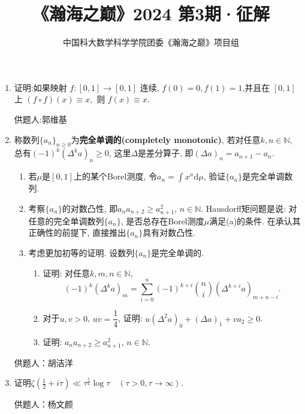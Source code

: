 \documentclass[lang=cn,12pt,a4paper]{elegantpaper.cls}
\title{《瀚海之巅》2024 第3期·征解}
\author{中国科大数学科学学院团委\quad《瀚海之巅》项目组}
\date{\zhtoday}
\begin{document}
\maketitle
\begin{enumerate}
	\item 
	证明:如果映射 $f:[0,1]\rightarrow[0,1]$ 连续, $f(0)=0,f(1)=1$,并且在 $[0,1]$ 上 $(f\circ f)(x)\equiv x,$ 则 $f(x)\equiv x.$
	
	\begin{flushright}
		\kaishu
		供题人:郭维基
	\end{flushright}
	
	
	\item 称数列$\{a_n\}_{n\geq 0}$为\textbf{完全单调的(completely monotonic)}, 若对任意$k,n\in\mathbb N$, 总有$(-1)^k(\Delta^k a)_n\geq 0$, 这里$\Delta$是差分算子, 即$(\Delta a)_n=a_{n+1}-a_n$.
	
	\begin{enumerate}
	\item 若$\mu$是$[0,1]$上的某个Borel测度, 令$a_n=\int x^n\mathrm{d}\mu$, 验证$\{a_n\}$是完全单调数列.
	
	\item 考察$\{a_n\}$的对数凸性, 即$a_na_{n+2}\geq a_{n+1}^2$, $n\in\mathbb N$. Hausdorff矩问题是说: 对任意的完全单调数列$\{a_n\}$, 是否总存在Borel测度$\mu$满足(a)的条件. 在承认其正确性的前提下, 直接推出$\{a_n\}$具有对数凸性.
	
	\item 考虑更加初等的证明. 设数列$\{a_n\}$是完全单调的.
	
	\begin{enumerate}[i]
	\item 证明: 对任意$k,m,n\in \mathbb N$, \[(-1)^k(\Delta^k a)_m=\sum_{i=0}^{n}(-1)^{k+i}\binom{n}{i}(\Delta^{k+i}a)_{m+n-i}.\]
	
	\item 对于$u,v>0$, $uv=\dfrac{1}{4}$, 证明: $u(\Delta^2 a)_0+(\Delta a)_1+va_2\geq0$.
	
	\item 证明: $a_na_{n+2}\geq a_{n+1}^2$, $n\in\mathbb N$.
\end{enumerate}
		\end{enumerate}
	
	\begin{flushright}
		\kaishu
		供题人：胡洁洋
	\end{flushright}
	
	\item 证明$\zeta(\frac{1}{2}+i \tau) \ll \tau^{\frac{1}{6}}\log \tau \quad (\tau>0, \tau \to \infty).$ 
			\begin{flushright}
			\kaishu
			供题人：杨文颜
		\end{flushright}
		

\end{enumerate}
\end{document}
